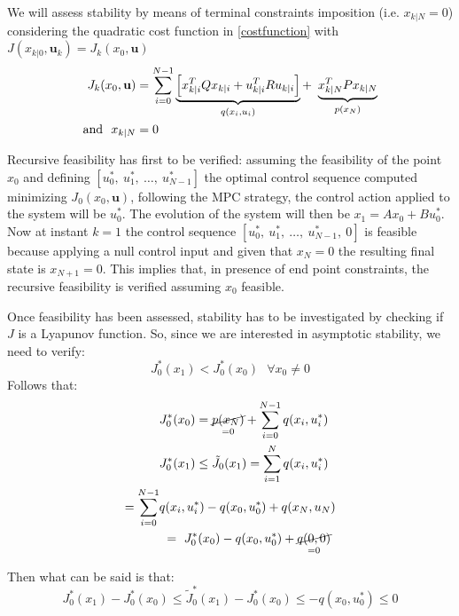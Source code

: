 We will assess stability by means of terminal constraints imposition (i.e. $x_{k|N}=0$) considering the quadratic cost function in \ref{costfunction} with  $J(x_{k|0},\textbf{u}_k)=J_k(x_0,\textbf{u})$
\begin{equation}
\begin{split}
J_k(x_0,\textbf{u}) &= \sum_{i=0}^{N-1} \underbrace{\left[x_{k|i}^T Q x_{k|i} + u_{k|i}^TRu_{k|i} \right]}_{q(x_i,u_i)} +\ \underbrace{x_{k|N}^T P x_{k|N}}_{p(x_N)} \\
\textnormal{and}\ \  x_{k|N}&=0
\end{split}
\end{equation}

Recursive feasibility has first to be verified: assuming the feasibility of the point $x_0$ and defining $[u_0^*,\ u_1^*,\ \dots,\ u_{N-1}^*]$ the optimal control sequence computed minimizing $J_0(x_0,\textbf{u})$, following the MPC strategy, the control action applied to the system will be $u_0^*$. The evolution of the system will then be $x_1=Ax_0+Bu_0^*$.
Now at instant $k=1$ the control sequence $[u_0^*,\ u_1^*,\ \dots,\ u_{N-1}^*,\ 0]$ is feasible because applying a null control input and given that $x_N=0$ the resulting final state is $x_{N+1}=0$. This implies that, in presence of end point constraints, the recursive feasibility is verified assuming $x_0$ feasible.

Once feasibility has been assessed, stability has to be investigated by checking if $J$ is a Lyapunov function. So, since we are interested in asymptotic stability, we need to verify:
\begin{equation}
J_0^*(x_1)<J_0^*(x_0)\ \ \ \forall x_0 \neq 0
\end{equation}
Follows that:
\begin{equation}
	\begin{split}
		&J_0^*(x_0)= \underset{=0}{\cancel{p(x_N)}}+\sum_{i=0}^{N-1} q(x_i,u_i^*) \\
		&J_0^*(x_1) \leq \tilde{J}_0(x_1)=\sum_{i=1}^{N}q(x_i,u_i^*) \\
		 = \sum_{i=0}^{N-1}&q(x_i,u_i^*)-q(x_0,u_0^*)+q(x_N,u_N) \\
		 &\ =\  J_0^*(x_0)-q(x_0,u_0^*)+\underset{=0}{\cancel{q(0,0)}} \\
	\end{split}
\end{equation}

Then what can be said is that:
\begin{equation}
	J_0^*(x_1)-J_0^*(x_0)\leq \tilde{J}_0^*(x_1) - J_0^*(x_0) \leq -q(x_0,u_0^*) \leq 0
\end{equation}

